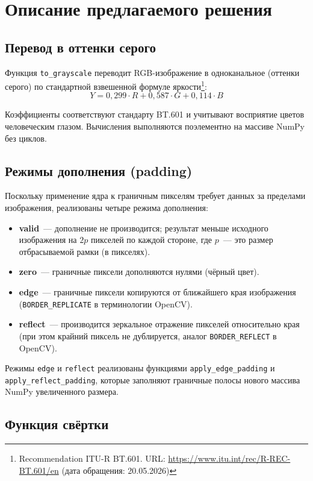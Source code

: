 \documentclass[a4paper]{article}
\begin{document}
\section{Описание предлагаемого решения}

\subsection{Перевод в оттенки серого}

Функция \verb|to_grayscale| переводит RGB-изображение в одноканальное (оттенки серого) по стандартной взвешенной формуле яркости\footnote{Recommendation ITU-R BT.601. URL: \url{https://www.itu.int/rec/R-REC-BT.601/en} (дата обращения: 20.05.2026)}:
\[
Y = 0{,}299 \cdot R + 0{,}587 \cdot G + 0{,}114 \cdot B
\]

Коэффициенты соответствуют стандарту BT.601 и учитывают восприятие цветов человеческим глазом. Вычисления выполняются поэлементно на массиве NumPy без циклов.

\subsection{Режимы дополнения (padding)}

Поскольку применение ядра к граничным пикселям требует данных за пределами изображения, реализованы четыре режима дополнения:

\begin{itemize}
    \item \textbf{valid}~--- дополнение не производится; результат меньше исходного изображения на \(2p\) пикселей по каждой стороне, где \(p\)~--- это размер отбрасываемой рамки (в пикселях).
    \item \textbf{zero}~--- граничные пиксели дополняются нулями (чёрный цвет).
    \item \textbf{edge}~--- граничные пиксели копируются от ближайшего края изображения (\verb|BORDER_REPLICATE| в терминологии OpenCV).
    \item \textbf{reflect}~--- производится зеркальное отражение пикселей относительно края (при этом крайний пиксель не дублируется, аналог \verb|BORDER_REFLECT| в OpenCV).
\end{itemize}

Режимы \verb|edge| и \verb|reflect| реализованы функциями \verb|apply_edge_padding| 
и \verb|apply_reflect_padding|, которые заполняют граничные полосы нового массива NumPy 
увеличенного размера.
\subsection{Функция свёртки}
\end{document}
